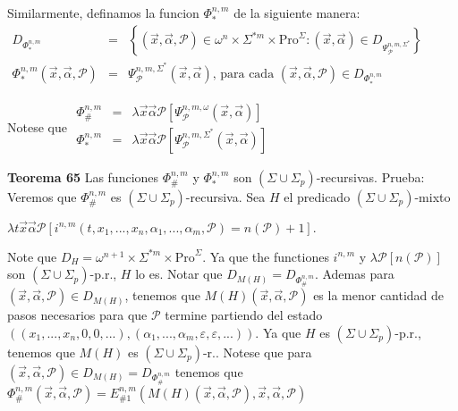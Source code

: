 Similarmente, definamos la funcion \(\Phi _{\ast }^{n,m}\) de la siguiente manera:
\(\displaystyle \begin{array}{rcl} D_{\Phi _{\ast }^{n,m}} & =& \left\{ (\vec{x},\vec{\alpha},\mathcal{P})\in \omega ^{n}\times \Sigma ^{\ast m}\times \mathrm{Pro}^{\Sigma }:(\vec{x}, \vec{\alpha})\in D_{\Psi _{\mathcal{P}}^{n,m,\Sigma ^{\ast }}}\right\} \\ \Phi _{\ast }^{n,m}(\vec{x},\vec{\alpha},\mathcal{P}) & =& \Psi _{\mathcal{P} }^{n,m,\Sigma ^{\ast }}(\vec{x},\vec{\alpha})\text{, para cada }(\vec{x}, \vec{\alpha},\mathcal{P})\in D_{\Phi _{\ast }^{n,m}} \end{array} \)

Notese que
\(\displaystyle \begin{array}{rcl} \Phi _{\#}^{n,m} & =& \lambda \vec{x}\vec{\alpha}\mathcal{P}\left[ \Psi _{ \mathcal{P}}^{n,m,\omega }(\vec{x},\vec{\alpha})\right] \\ \Phi _{\ast }^{n,m} & =& \lambda \vec{x}\vec{\alpha}\mathcal{P}\left[ \Psi _{ \mathcal{P}}^{n,m,\Sigma ^{\ast }}(\vec{x},\vec{\alpha})\right] \end{array} \)





\textbf{Teorema 65} Las funciones \(\Phi _{\#}^{n,m}\) y \(\Phi _{\ast }^{n,m}\) son \((\Sigma \cup \Sigma _{p})\)-recursivas.
Prueba: Veremos que \(\Phi _{\#}^{n,m}\) es \((\Sigma \cup \Sigma _{p})\)-recursiva. Sea \(H\) el predicado \((\Sigma \cup \Sigma _{p})\)-mixto

\(\displaystyle \lambda t\vec{x}\vec{\alpha}\mathcal{P}\left[ i^{n,m}(t,x_{1},...,x_{n}, \alpha _{1},...,\alpha _{m},\mathcal{P})=n(\mathcal{P})+1\right] \text{.} \)

Note que \(D_{H}=\omega ^{n+1}\times \Sigma ^{\ast m}\times \mathrm{Pro} ^{\Sigma }\). Ya que the functiones \(i^{n,m}\) y \(\lambda \mathcal{P}\left[ n( \mathcal{P})\right] \) son \((\Sigma \cup \Sigma _{p})\)-p.r., \(H\) lo es. Notar que \(D_{M(H)}=D_{\Phi _{\#}^{n,m}}\). Ademas para \((\vec{x},\vec{\alpha}, \mathcal{P})\in D_{M(H)}\), tenemos que \(M(H)(\vec{x},\vec{\alpha},\mathcal{P} )\) es la menor cantidad de pasos necesarios para que \(\mathcal{P}\) termine partiendo del estado \(((x_{1},...,x_{n},0,0,...),(\alpha _{1},...,\alpha _{m},\varepsilon ,\varepsilon ,...))\). Ya que \(H\) es \((\Sigma \cup \Sigma _{p})\)-p.r., tenemos que \(M(H)\) es \((\Sigma \cup \Sigma _{p})\)-r.. Notese que para \((\vec{x},\vec{\alpha},\mathcal{P})\in D_{M(H)}=D_{\Phi _{\#}^{n,m}} \) tenemos que
\(\displaystyle \Phi _{\#}^{n,m}(\vec{x},\vec{\alpha},\mathcal{P})=E_{\#1}^{n,m}\left( M(H)( \vec{x},\vec{\alpha},\mathcal{P}),\vec{x},\vec{\alpha},\mathcal{P}\right) \)

